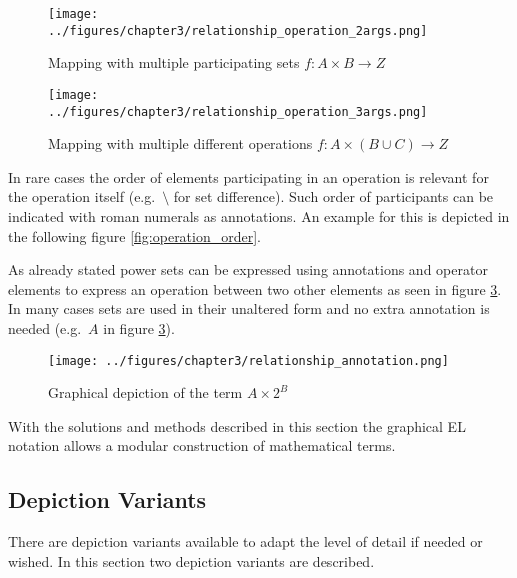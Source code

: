 \documentclass[twoside, openright, 12pt]{book}
\begin{document}
\begin{figure}[!htb]
	\centering
	\texttt{[image: ../figures/chapter3/relationship\_operation\_2args.png]}
	\caption{Mapping with multiple participating sets $f:A \times B \rightarrow Z$}
	\label{fig:relationship_operation_2args}
\end{figure}

\begin{figure}[!htb]
	\centering
	\texttt{[image: ../figures/chapter3/relationship\_operation\_3args.png]}
	\caption{Mapping with multiple different operations $f:A \times ( B \cup C ) \rightarrow Z$ }
	\label{fig:relationship_operation_3args}
\end{figure}

\noindent
In rare cases the order of elements participating in an operation is relevant for the operation itself (e.g.~$\setminus$ for set difference).
Such order of participants can be indicated with roman numerals as annotations.
An example for this is depicted in the following figure \ref{fig:operation_order}.


As already stated power sets can be expressed using annotations and operator elements to express an operation between two other elements as seen in figure \ref{fig:relationship_annotation}.
In many cases sets are used in their unaltered form and no extra annotation is needed (e.g.\ $A$ in figure \ref{fig:relationship_annotation}).

\begin{figure}[htb]
	\centering
	\texttt{[image: ../figures/chapter3/relationship\_annotation.png]}
	\caption{Graphical depiction of the term $A \times 2^B$}
	\label{fig:relationship_annotation}
\end{figure}

\noindent
With the solutions and methods described in this section the graphical EL notation allows a modular construction of mathematical terms.



\subsection{Depiction Variants}
\label{variants}
There are depiction variants available to adapt the level of detail if needed or wished.
In this section two depiction variants are described.
\end{document}
